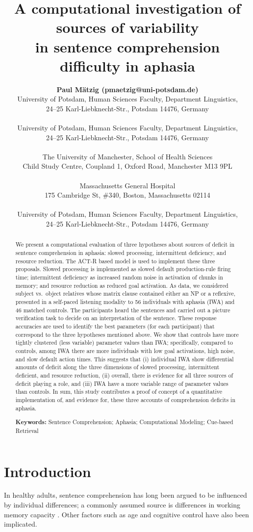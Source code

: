 \documentclass[10pt,letterpaper]{article}
\title{A computational investigation of sources of variability\\
 in sentence comprehension difficulty in aphasia}
\author{{\large\bf Paul M\"{a}tzig (pmaetzig@uni-potsdam.de)} \\
        University of Potsdam, Human Sciences Faculty, Department Linguistics,\\
        24--25 Karl-Liebknecht-Str., Potsdam 14476, Germany\\
        \AND {\large\bf Shravan Vasishth, (vasishth@uni-potsdam.de)} \\
        University of Potsdam, Human Sciences Faculty, Department Linguistics,\\
        24--25 Karl-Liebknecht-Str., Potsdam 14476, Germany\\
        \AND {\large\bf Felix Engelmann (felix.engelmann@manchester.ac.uk)} \\
        The University of Manchester, School of Health Sciences\\
        Child Study Centre, Coupland 1, Oxford Road, Manchester M13 9PL\\
        \AND {\large\bf David Caplan (dcaplan@partners.org)} \\
        Massachusetts General Hospital \\
        175 Cambridge St, \#340, Boston, Massachusetts 02114\\
        \AND {\large\bf Frank Burchert, (burchert@uni-potsdam.de)} \\
        University of Potsdam, Human Sciences Faculty, Department Linguistics,\\
        24--25 Karl-Liebknecht-Str., Potsdam 14476, Germany}
\begin{document}
\maketitle

\begin{abstract} We present a computational evaluation of three hypotheses about sources of deficit in sentence comprehension in aphasia: slowed processing, intermittent deficiency, and resource reduction.  The ACT-R based  model is used to implement these three proposals. Slowed processing is implemented as slowed default production-rule firing time; intermittent deficiency as increased random noise in activation of chunks in memory; and resource reduction as reduced goal activation. As data, we considered subject vs.\ object relatives whose matrix clause contained either an NP or a reflexive, presented in a self-paced listening modality to 56 individuals with aphasia (IWA) and 46 matched controls. The participants heard the sentences and carried out a picture verification task to decide on an interpretation of the sentence. These response accuracies are used to identify the best parameters (for each participant) that correspond to the three hypotheses mentioned above. We show that controls have more tightly clustered (less variable) parameter values than IWA; specifically, compared to controls, among IWA there are more individuals with low goal activations, high noise, and slow default action times. This suggests that (i) individual IWA show differential amounts of deficit along the three dimensions of slowed processing, intermittent deficient, and resource reduction, (ii) overall, there is evidence for all three sources of deficit playing a role, and (iii) IWA have a more variable range of parameter values than controls. In sum, this study contributes a proof of concept of a quantitative implementation of, and evidence for, these three accounts of comprehension deficits in aphasia.

\textbf{Keywords:}  
Sentence Comprehension; Aphasia; Computational Modeling; Cue-based Retrieval
\end{abstract}

\section{Introduction}

In healthy adults, 
sentence comprehension has long been argued to be influenced by individual differences; a commonly assumed source is differences in working memory capacity  \cite{dc80,jc92}. 
Other factors such as age \cite{CaplanWaters2005} and cognitive control \cite{novick2005cognitive} have also been implicated.
\end{document}
